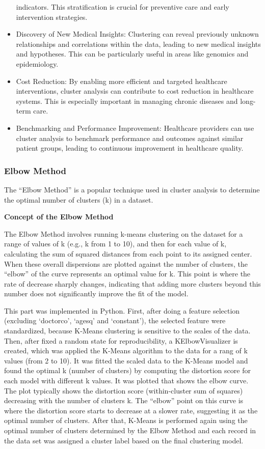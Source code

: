 \documentclass[
]{article}
\begin{document}
\begin{itemize}
  indicators. This stratification is crucial for preventive care and
  early intervention strategies.
\item
  Discovery of New Medical Insights: Clustering can reveal previously
  unknown relationships and correlations within the data, leading to new
  medical insights and hypotheses. This can be particularly useful in
  areas like genomics and epidemiology.
\item
  Cost Reduction: By enabling more efficient and targeted healthcare
  interventions, cluster analysis can contribute to cost reduction in
  healthcare systems. This is especially important in managing chronic
  diseases and long-term care.
\item
  Benchmarking and Performance Improvement: Healthcare providers can use
  cluster analysis to benchmark performance and outcomes against similar
  patient groups, leading to continuous improvement in healthcare
  quality.
\end{itemize}

\subsubsection{Elbow Method}\label{elbow-method}

The ``Elbow Method'' is a popular technique used in cluster analysis to
determine the optimal number of clusters (k) in a dataset.

\textbf{Concept of the Elbow Method}

The Elbow Method involves running k-means clustering on the dataset for
a range of values of k (e.g., k from 1 to 10), and then for each value
of k, calculating the sum of squared distances from each point to its
assigned center. When these overall dispersions are plotted against the
number of clusters, the ``elbow'' of the curve represents an optimal
value for k. This point is where the rate of decrease sharply changes,
indicating that adding more clusters beyond this number does not
significantly improve the fit of the model.

This part was implemented in Python. First, after doing a feature
selection (excluding `doctorco', `agesq' and `constant'), the selected
feature were standardized, because K-Means clustering is sensitive to
the scales of the data. Then, after fixed a random state for
reproducibility, a KElbowVisualizer is created, which was applied the
K-Means algorithm to the data for a rang of k values (from 2 to 10). It
was fitted the scaled data to the K-Means model and found the optimal k
(number of clusters) by computing the distortion score for each model
with different k values. It was plotted that shows the elbow curve. The
plot typically shows the distortion score (within-cluster sum of
squares) decreasing with the number of clusters k. The ``elbow'' point
on this curve is where the distortion score starts to decrease at a
slower rate, suggesting it as the optimal number of clusters. After
that, K-Means is performed again using the optimal number of clusters
determined by the Elbow Method and each record in the data set was
assigned a cluster label based on the final clustering model.
\end{document}
